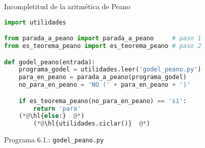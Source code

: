 \documentclass[10pt,xcolor=dvipsnames,aspectratio=169,spanish]{beamer}
\makeatletter
\let\HL\hl
\renewcommand\hl{%
  \let\set@color\beamerorig@set@color
  \let\reset@color\beamerorig@reset@color
  \HL}
\makeatother
\begin{document}
\begin{frame}[fragile]{Incompletitud de la aritmética de Peano}

\begin{lstlisting}[language=Python]
import utilidades

from parada_a_peano import parada_a_peano     # paso 1
from es_teorema_peano import es_teorema_peano # paso 2

def godel_peano(entrada):
    programa_godel = utilidades.leer('godel_peano.py')
    para_en_peano = parada_a_peano(programa_godel)
    no_para_en_peano = 'NO (' + para_en_peano + ')'

    if es_teorema_peano(no_para_en_peano) == 'sí':
        return 'para'
    (*@\hl{else:}  @*)
        (*@\hl{utilidades.ciclar()}  @*)
\end{lstlisting}
\vspace*{-4mm}
\begin{center}
{\small Programa 6.1.: \texttt{godel\_peano.py}}
\end{center}

\end{frame}





\end{document}
